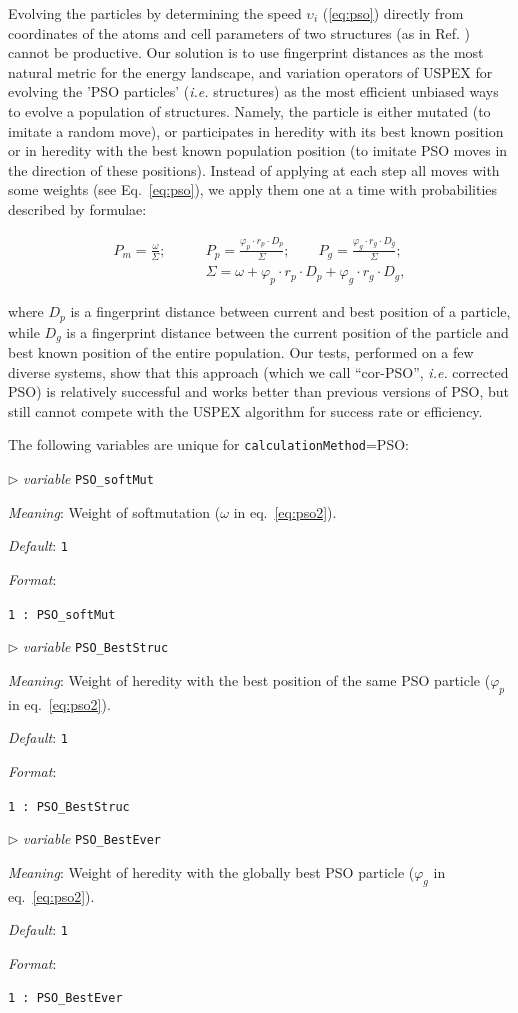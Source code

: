\documentclass[12pt]{article}
\newcommand{\keyword}[1]{\texttt{#1}}
\newcommand{\paramacro}[6]{
\vspace{0.5cm}
$\triangleright$ \emph{variable} {\color{blue} \texttt{#1}}

\emph{Meaning}: {#2}

{#3}

\emph{Default}: \texttt{#4}

\emph{Format}:

{\addtolength{\leftskip}{10mm} 
\texttt{#5}
\par}


{\small #6}

}
\begin{document}
Evolving the particles by determining the speed $\upsilon_{i}$ (\ref{eq:pso})
directly from coordinates of the atoms and cell parameters of two structures (as
in Ref. \cite{Wang2010}) cannot be productive. Our solution is to use
fingerprint distances \cite{Oganov2009} as the most natural metric for the
energy landscape, and variation operators of USPEX for evolving the 'PSO
particles' (\emph{i.e.} structures) as the most efficient unbiased ways to
evolve a population of structures. Namely, the particle is either mutated (to
imitate a random move), or participates in heredity with its best known position
or in heredity with the best known population position (to imitate PSO moves in
the direction of these positions). Instead of applying at each step all moves
with some weights (see Eq.~\ref{eq:pso}), we apply them one at a time with
probabilities described by formulae:

\begin{equation}\label{eq:pso2}
\begin{aligned}
P_{m} = \frac{\omega}{\Sigma};\qquad
&P_{p} = \frac{\varphi_{p} \cdot r_{p} \cdot D_{p}}{\Sigma};\qquad
P_{g} = \frac{\varphi_{g} \cdot r_{g} \cdot D_{g}}{\Sigma};\\
&\Sigma = \omega + \varphi_{p} \cdot r_{p} \cdot D_{p} + \varphi_{g} \cdot
r_{g} \cdot D_{g},
\end{aligned}
\end{equation}

where $D_{p}$ is a fingerprint distance between current and best position of a
particle, while $D_{g}$ is a fingerprint distance between the current position
of the particle and best known position of the entire population. Our tests,
performed on a few diverse systems, show that this approach (which we call
``cor-PSO'', \emph{i.e.} corrected PSO) is relatively successful and works
better than previous versions of PSO, but still cannot compete with the USPEX
algorithm \cite{Oganov2006, Lyakhov2010} for success rate or efficiency.

The following variables are unique for \keyword{calculationMethod}=PSO:

\paramacro{PSO\_softMut}{Weight of softmutation ($\omega$ in
eq.~\ref{eq:pso2}).}{}{1}{1 : PSO\_softMut}{}

\paramacro{PSO\_BestStruc}{Weight of heredity with the best position of the same
PSO particle ($\varphi_{p}$ in eq.~\ref{eq:pso2}).}{}{1}{1 : PSO\_BestStruc}{}

\paramacro{PSO\_BestEver}{Weight of heredity with the globally best PSO particle
($\varphi_{g}$ in eq.~\ref{eq:pso2}).}{}{1}{1 : PSO\_BestEver}{}
\end{document}
